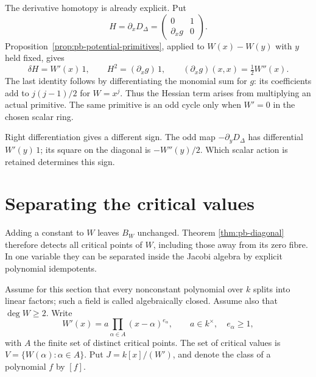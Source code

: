 The derivative homotopy is already explicit. Put
\[
 H=\partial_xD_\Delta
   =\begin{pmatrix}0&1\\\partial_xg&0\end{pmatrix}.
\]
Proposition~\ref{prop:pb-potential-primitives}, applied to
\(W(x)-W(y)\) with \(y\) held fixed, gives
\[
 \delta H=W'(x)\,1,\qquad
 H^2=(\partial_xg)\,1,\qquad
 (\partial_xg)(x,x)=\tfrac12W''(x).
\]
The last identity follows by differentiating the monomial sum for
\(g\): its coefficients add to \(j(j-1)/2\) for \(W=x^j\).
Thus the Hessian term arises from multiplying an actual primitive.
The same primitive is an odd cycle only when \(W'=0\) in the
chosen scalar ring.

Right differentiation gives a different sign. The odd map
\(-\partial_yD_\Delta\) has differential \(W'(y)\,1\);
its square on the diagonal is \(-W''(y)/2\).
Which scalar action is retained determines this sign.

\section{Separating the critical values}
\label{sec:pb-critical-values}

Adding a constant to \(W\) leaves \(B_W\) unchanged. Theorem
\ref{thm:pb-diagonal} therefore detects all critical points of \(W\),
including those away from its zero fibre. In one variable they can
be separated inside the Jacobi algebra by explicit polynomial
idempotents.

Assume for this section that every nonconstant polynomial over \(k\)
splits into linear factors; such a field is called algebraically
closed. Assume also that \(\deg W\geq2\). Write
\[
 W'(x)=a\prod_{\alpha\in A}(x-\alpha)^{e_\alpha},
 \qquad a\in k^\times,\quad e_\alpha\geq1,
\]
with \(A\) the finite set of distinct critical points.
The set of critical values is
\(V=\{W(\alpha):\alpha\in A\}\).
Put \(J=k[x]/(W')\), and denote the class of a polynomial \(f\)
by \([f]\).

